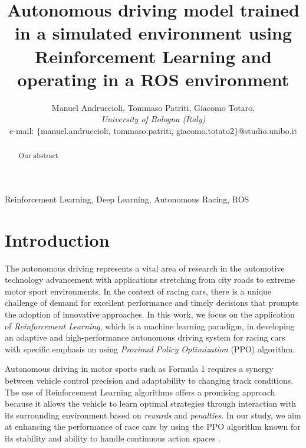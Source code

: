 \documentclass[conference]{IEEEtran}
\begin{document}
\title{
    Autonomous driving model trained in a simulated environment using Reinforcement Learning and operating in a ROS environment
}

\author{Manuel Andruccioli,
Tommaso Patriti,
Giacomo Totaro,\\ 
\textit{University of Bologna (Italy)} \\
e-mail: $\{$manuel.andruccioli, tommaso.patriti, giacomo.totato2$\}$@studio.unibo.it }

\maketitle

\begin{abstract}
Our abstract
\end{abstract}

\begin{IEEEkeywords}
    Reinforcement Learning, Deep Learning, Autonomous Racing, ROS
\end{IEEEkeywords}

\section{Introduction}




The autonomous driving represents a vital area of research in the automotive technology advancement with applications stretching from city roads to extreme motor sport environments.
%
In the context of racing cars, there is a unique challenge of demand for excellent performance and timely decisions that prompts the adoption of innovative approaches.
%
In this work, we focus on the application of \emph{Reinforcement Learning}, which is a machine learning paradigm, in developing an adaptive and high-performance autonomous driving system for racing cars with specific emphasis on using \emph{Proximal Policy Optimization} (PPO) algorithm.

Autonomous driving in motor sports such as Formula 1 requires a synergy between vehicle control precision and adaptability to changing track conditions.
%
The use of Reinforcement Learning algorithms offers a promising approach because it allows the vehicle to learn optimal strategies through interaction with its surrounding environment based on \emph{rewards} and \emph{penalties}.
%
In our study, we aim at enhancing the performance of race cars by using the PPO algorithm known for its stability and ability to handle continuous action spaces \cite{PPOOpenAI}.
\end{document}
